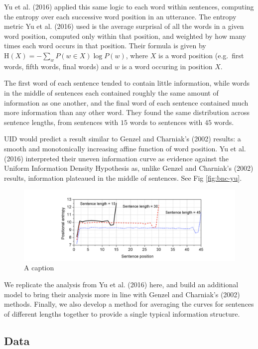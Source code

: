 \documentclass[man,floatsintext]{apa6}
\begin{document}
Yu et al. (2016) applied this same logic to each word within sentences, computing the entropy over each successive word position in an utterance. The entropy metric Yu et al. (2016) used is the average surprisal of all the words in a given word position, computed only within that position, and weighted by how many times each word occurs in that position. Their formula is given by \(\text{H}(X) = -\sum_{w}P(w \in X) \log P(w)\), where \(X\) is a word position (e.g.~first words, fifth words, final words) and \(w\) is a word occuring in position \(X\).

The first word of each sentence tended to contain little information, while words in the middle of sentences each contained roughly the same amount of information as one another, and the final word of each sentence contained much more information than any other word. They found the same distribution across sentence lengths, from sentences with \(15\) words to sentences with \(45\) words.

UID would predict a result similar to Genzel and Charniak's (2002) results: a smooth and monotonically increasing affine function of word position. Yu et al. (2016) interpreted their uneven information curve as evidence against the Uniform Information Density Hypothesis as, unlike Genzel and Charniak's (2002) results, information plateaued in the middle of sentences. See Fig \ref{fig:bnc-yu}.

\begin{figure}[tb]
\includegraphics[width=1\linewidth]{figs/bnc-yu} \caption{A caption}\label{fig:pressure}
\end{figure}

We replicate the analysis from Yu et al. (2016) here, and build an additional model to bring their analysis more in line with Genzel and Charniak's (2002) methods. Finally, we also develop a method for averaging the curves for sentences of different lengths together to provide a single typical information structure.

\hypertarget{data}{%
\subsection{Data}\label{data}}
\end{document}
